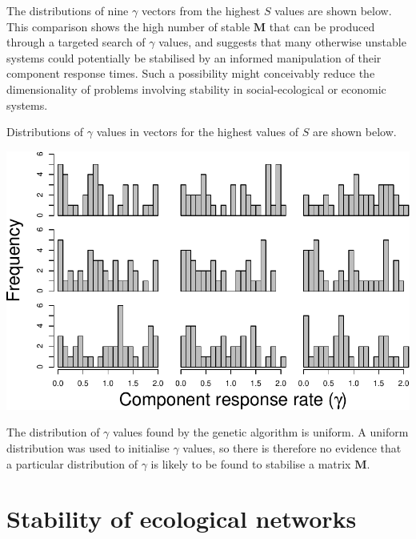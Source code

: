 \documentclass[]{article}
\begin{document}
The distributions of nine \(\gamma\) vectors from the highest \(S\)
values are shown below. This comparison shows the high number of stable
\(\mathbf{M}\) that can be produced through a targeted search of
\(\gamma\) values, and suggests that many otherwise unstable systems
could potentially be stabilised by an informed manipulation of their
component response times. Such a possibility might conceivably reduce
the dimensionality of problems involving stability in social-ecological
or economic systems.

Distributions of \(\gamma\) values in vectors for the highest values of
\(S\) are shown below.

\includegraphics{SI_files/figure-latex/unnamed-chunk-8-1.pdf}

The distribution of \(\gamma\) values found by the genetic algorithm is
uniform. A uniform distribution was used to initialise \(\gamma\)
values, so there is therefore no evidence that a particular distribution
of \(\gamma\) is likely to be found to stabilise a matrix
\(\mathbf{M}\).

\hypertarget{ecological}{%
\section{Stability of ecological networks}\label{ecological}}
\end{document}
